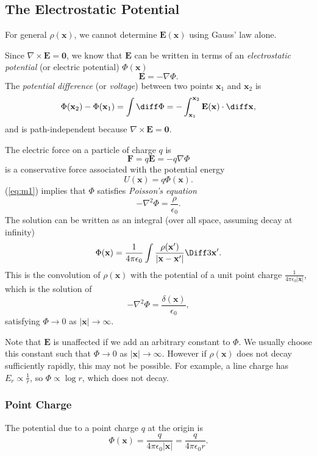 \documentclass[12pt]{article}
\begin{document}
\subsection{The Electrostatic Potential}
\label{sub:the_electrostatic_potential}

For general $\rho(\mathbf{x})$, we cannot determine $\mathbf{E}(\mathbf{x})$ using Gauss' law alone.

Since $\nabla \times \mathbf{E} = \mathbf{0}$, we know that $\mathbf{E}$ can be written in terms of an \emph{electrostatic potential} (or electric potential) $\Phi(\mathbf{x})$
\[
\mathbf{E} = - \nabla \Phi
.\]
The \emph{potential difference} (or \emph{voltage}) between two points $\mathbf{x}_1$ and $\mathbf{x}_2$ is
\[
\Phi(\mathbf{x}_2) - \Phi(\mathbf{x}_1) = \int \diff \Phi = - \int_{\mathbf{x}_1}^{\mathbf{x}_2} \mathbf{E}(\mathbf{x}) \cdot \diff \mathbf{x}
,\]
and is path-independent because $\nabla \times \mathbf{E} = \mathbf{0}$.

The electric force on a particle of charge $q$ is
\[
\mathbf{F} = q \mathbf{E} = - q \nabla \Phi
\]
is a conservative force associated with the potential energy
\[
U(\mathbf{x}) = q \Phi(\mathbf{x})
.\]
(\ref{eq:m1}) implies that $\Phi$ satisfies \emph{Poisson's equation}
\[
- \nabla^2 \Phi = \frac{\rho}{\epsilon_0}
.\]
The solution can be written as an integral (over all space, assuming decay at infinity)
\[
\Phi(\mathbf{x}) = \frac{1}{4 \pi \epsilon_0} \int \frac{\rho(\mathbf{x}')}{|\mathbf{x} - \mathbf{x}'|} \Diff3 \mathbf{x}'
.\]
This is the convolution of $\rho(\mathbf{x})$ with the potential of a unit point charge $\frac{1}{4 \pi \epsilon_0 |\mathbf{x}|}$, which is the solution of
\[
- \nabla^2 \Phi = \frac{\delta (\mathbf{x})}{\epsilon_0}
,\]
satisfying $\Phi \to 0$ as $|\mathbf{x}| \to \infty$.

Note that $\mathbf{E}$ is unaffected if we add an arbitrary constant to $\Phi$. We usually choose this constant such that $\Phi \to 0$ as $|\mathbf{x}| \to \infty$. However if $\rho(\mathbf{x})$ does not decay sufficiently rapidly, this may not be possible. For example, a line charge has $E_r \propto \frac{1}{r}$, so $\Phi \propto \log r$, which does not decay.

\subsubsection{Point Charge}
\label{subsub:point_charge}

The potential due to a point charge $q$ at the origin is
\[
\Phi(\mathbf{x}) = \frac{q}{4 \pi \epsilon_0 |\mathbf{x}|} = \frac{q}{4 \pi \epsilon_0 r}
.\]
\end{document}

